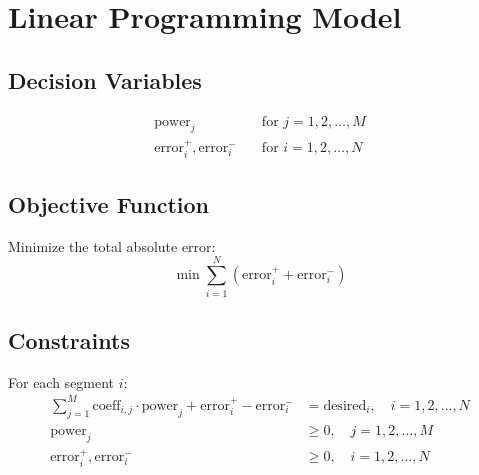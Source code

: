 \documentclass{article}
\begin{document}
\section*{Linear Programming Model}

\subsection*{Decision Variables}
\begin{align*}
    \text{power}_j & \quad \text{for } j = 1, 2, \ldots, M \\
    \text{error}_i^+, \text{error}_i^- & \quad \text{for } i = 1, 2, \ldots, N
\end{align*}

\subsection*{Objective Function}
Minimize the total absolute error:
\[
\min \sum_{i=1}^{N} (\text{error}_i^+ + \text{error}_i^-)
\]

\subsection*{Constraints}
For each segment \( i \):
\begin{align*}
    \sum_{j=1}^{M} \text{coeff}_{i,j} \cdot \text{power}_j + \text{error}_i^+ - \text{error}_i^- &= \text{desired}_i, \quad i = 1, 2, \ldots, N \\
    \text{power}_j &\geq 0, \quad j = 1, 2, \ldots, M \\
    \text{error}_i^+, \text{error}_i^- &\geq 0, \quad i = 1, 2, \ldots, N
\end{align*}
\end{document}
